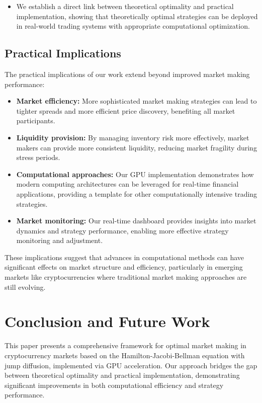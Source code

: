 \documentclass[twocolumn,11pt]{IEEEtran}  %
\begin{document}
\begin{onecolumn}
\begin{twocolumn}
\begin{itemize}
    \item We establish a direct link between theoretical optimality and practical implementation, showing that theoretically optimal strategies can be deployed in real-world trading systems with appropriate computational optimization.
\end{itemize}

\subsection{Practical Implications}

The practical implications of our work extend beyond improved market making performance:

\begin{itemize}
    \item \textbf{Market efficiency:} More sophisticated market making strategies can lead to tighter spreads and more efficient price discovery, benefiting all market participants.
    
    \item \textbf{Liquidity provision:} By managing inventory risk more effectively, market makers can provide more consistent liquidity, reducing market fragility during stress periods.
    
    \item \textbf{Computational approaches:} Our GPU implementation demonstrates how modern computing architectures can be leveraged for real-time financial applications, providing a template for other computationally intensive trading strategies.
    
    \item \textbf{Market monitoring:} Our real-time dashboard provides insights into market dynamics and strategy performance, enabling more effective strategy monitoring and adjustment.
\end{itemize}

These implications suggest that advances in computational methods can have significant effects on market structure and efficiency, particularly in emerging markets like cryptocurrencies where traditional market making approaches are still evolving.

\section{Conclusion and Future Work}

This paper presents a comprehensive framework for optimal market making in cryptocurrency markets based on the Hamilton-Jacobi-Bellman equation with jump diffusion, implemented via GPU acceleration. Our approach bridges the gap between theoretical optimality and practical implementation, demonstrating significant improvements in both computational efficiency and strategy performance.


\end{twocolumn}
\end{onecolumn}
\end{document}
